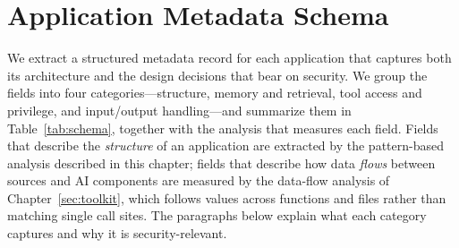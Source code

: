 \label{chap:implement}



\section{Application Metadata Schema}
\label{sec:metadata-format}

We extract a structured metadata record for each application that captures both its architecture and the design decisions that bear on security. We group the fields into four categories---structure, memory and retrieval, tool access and privilege, and input/output handling---and summarize them in Table~\ref{tab:schema}, together with the analysis that measures each field. Fields that describe the \emph{structure} of an application are extracted by the pattern-based analysis described in this chapter; fields that describe how data \emph{flows} between sources and AI components are measured by the data-flow analysis of Chapter~\ref{sec:toolkit}, which follows values across functions and files rather than matching single call sites. The paragraphs below explain what each category captures and why it is security-relevant.

